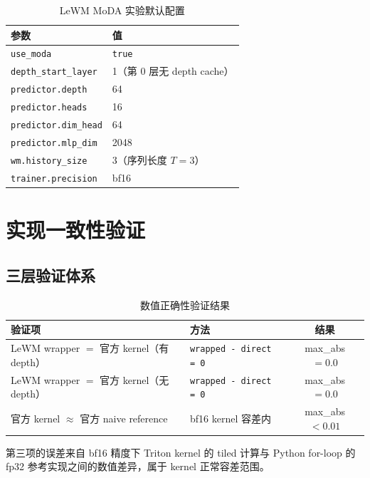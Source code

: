 \documentclass[11pt,a4paper]{article}
\begin{document}
\begin{table}[h]
\centering
\begin{tabular}{ll}
\toprule
参数 & 值 \\
\midrule
\texttt{use\_moda} & \texttt{true} \\
\texttt{depth\_start\_layer} & 1（第 0 层无 depth cache） \\
\texttt{predictor.depth} & 64 \\
\texttt{predictor.heads} & 16 \\
\texttt{predictor.dim\_head} & 64 \\
\texttt{predictor.mlp\_dim} & 2048 \\
\texttt{wm.history\_size} & 3（序列长度 $T=3$） \\
\texttt{trainer.precision} & bf16 \\
\bottomrule
\end{tabular}
\caption{LeWM MoDA 实验默认配置}
\end{table}

\section{实现一致性验证}

\subsection{三层验证体系}

\begin{table}[h]
\centering
\begin{tabular}{llc}
\toprule
验证项 & 方法 & 结果 \\
\midrule
LeWM wrapper $=$ 官方 kernel（有 depth） & \texttt{wrapped - direct = 0} & max\_abs $= 0.0$ \\
LeWM wrapper $=$ 官方 kernel（无 depth） & \texttt{wrapped - direct = 0} & max\_abs $= 0.0$ \\
官方 kernel $\approx$ 官方 naive reference & bf16 kernel 容差内 & max\_abs $< 0.01$ \\
\bottomrule
\end{tabular}
\caption{数值正确性验证结果}
\end{table}

第三项的误差来自 bf16 精度下 Triton kernel 的 tiled 计算与 Python for-loop 的 fp32 参考实现之间的数值差异，属于 kernel 正常容差范围。
\end{document}
